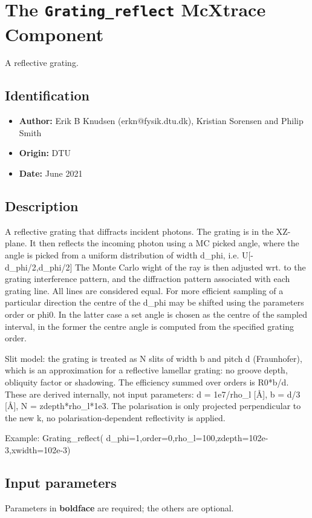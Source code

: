 \section{The \texttt{Grating\_reflect} McXtrace Component}
A reflective grating.

\subsection*{Identification}
\begin{itemize}
  \item \textbf{Author:} Erik B Knudsen (erkn@fysik.dtu.dk), Kristian Sorensen and Philip Smith
  \item \textbf{Origin:} DTU
  \item \textbf{Date:} June 2021
\end{itemize}

\subsection*{Description}
A reflective grating that diffracts incident photons. The grating is in the XZ-plane. It then reflects the incoming photon using a MC picked angle, where the angle is picked from a uniform distribution of width d\_phi, i.e. U[-d\_phi/2,d\_phi/2] The Monte Carlo wight of the ray is then adjusted wrt. to the grating interference pattern, and the diffraction pattern associated with each grating line. All lines are considered equal. For more efficient sampling of a particular direction the centre of the d\_phi may be shifted using the parameters order or phi0. In the latter case a set angle is chosen as the centre of the sampled interval, in the former the centre angle is computed from the specified grating order.

Slit model: the grating is treated as N slits of width b and pitch d (Fraunhofer), which is an approximation for a reflective lamellar grating: no groove depth, obliquity factor or shadowing. The efficiency summed over orders is R0*b/d. These are derived internally, not input parameters: d = 1e7/rho\_l [\AA{}], b = d/3 [\AA{}], N = zdepth*rho\_l*1e3. The polarisation is only projected perpendicular to the new k, no polarisation-dependent reflectivity is applied.

Example: Grating\_reflect( d\_phi=1,order=0,rho\_l=100,zdepth=102e-3,xwidth=102e-3)

\subsection*{Input parameters}
Parameters in \textbf{boldface} are required; the others are optional.

